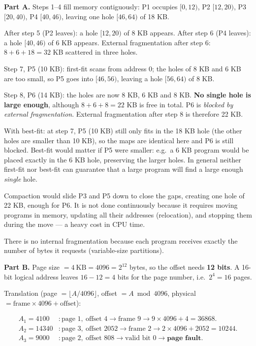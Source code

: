 \documentclass[11pt]{article}
\newcommand{\cle}[1]{{\popxbold\color{popdark}#1}}
\newcounter{popsec}
\newcounter{popsub}
\newcommand{\courssub}[1]{%
  \stepcounter{popsub}%
  \par\vspace{9pt}\noindent{\popxbold\fontsize{11.5}{13}\selectfont\color{popink}{\color{poporange}\thepopsec.\thepopsub}\hspace{6pt}#1}\par\nopagebreak\vspace{4pt}
}
\begin{document}
\courssub{Model answer}

\textbf{Part A.} Steps 1--4 fill memory contiguously: P1 occupies $[0,12)$, P2 $[12,20)$, P3 $[20,40)$, P4 $[40,46)$, leaving one hole $[46,64)$ of 18 KB.

After step 5 (P2 leaves): a hole $[12,20)$ of 8 KB appears. After step 6 (P4 leaves): a hole $[40,46)$ of 6 KB appears. External fragmentation after step 6: $8 + 6 + 18 = 32$ KB scattered in three holes.

Step 7, P5 (10 KB): first-fit scans from address 0; the holes of 8 KB and 6 KB are too small, so P5 goes into $[46,56)$, leaving a hole $[56,64)$ of 8 KB.

Step 8, P6 (14 KB): the holes are now 8 KB, 6 KB and 8 KB. \textbf{No single hole is large enough}, although $8+6+8 = 22$ KB is free in total. P6 is \emph{blocked by external fragmentation}. External fragmentation after step 8 is therefore 22 KB.

With best-fit: at step 7, P5 (10 KB) still only fits in the 18 KB hole (the other holes are smaller than 10 KB), so the maps are identical here and P6 is still blocked. Best-fit would matter if P5 were smaller: e.g.\ a 6 KB program would be placed exactly in the 6 KB hole, preserving the larger holes. In general neither first-fit nor best-fit can guarantee that a large program will find a large enough \emph{single} hole.

Compaction would slide P3 and P5 down to close the gaps, creating one hole of 22 KB, enough for P6. It is not done continuously because it requires moving programs in memory, updating all their addresses (relocation), and stopping them during the move — a heavy cost in CPU time.

There is no internal fragmentation because each program receives exactly the number of bytes it requests (variable-size partitions).

\textbf{Part B.} Page size $= 4\ \mathrm{KB} = 4096 = 2^{12}$ bytes, so the \cle{offset} needs \textbf{12 bits}. A 16-bit logical address leaves $16 - 12 = 4$ bits for the page number, i.e.\ $2^4 = 16$ pages.

Translation (page $= \lfloor A / 4096 \rfloor$, offset $= A \bmod 4096$, physical $= \text{frame} \times 4096 + \text{offset}$):

\begin{align*}
A_1 = 4100 &: \text{page } 1,\ \text{offset } 4 \rightarrow \text{frame } 9 \rightarrow 9 \times 4096 + 4 = 36868.\\
A_2 = 14340 &: \text{page } 3,\ \text{offset } 2052 \rightarrow \text{frame } 2 \rightarrow 2 \times 4096 + 2052 = 10244.\\
A_3 = 9000 &: \text{page } 2,\ \text{offset } 808 \rightarrow \text{valid bit } 0 \rightarrow \textbf{page fault}.
\end{align*}
\end{document}
